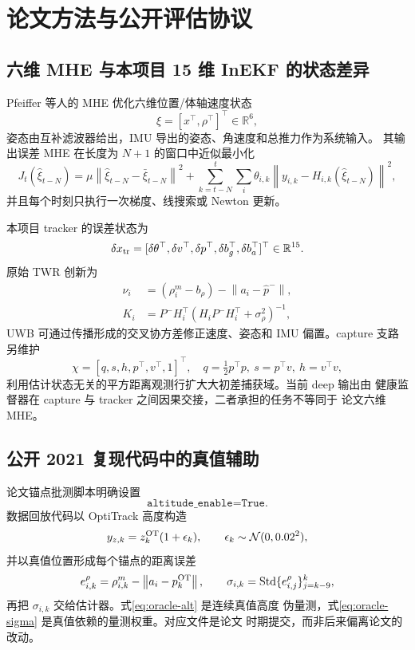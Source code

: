 \documentclass[11pt,a4paper]{ctexart}
\newcommand{\norm}[1]{\left\lVert #1\right\rVert}
\newcommand{\R}{\mathbb{R}}
\begin{document}
\section{论文方法与公开评估协议}

\subsection{六维 MHE 与本项目 15 维 InEKF 的状态差异}

Pfeiffer 等人的 MHE 优化六维位置/体轴速度状态
\begin{equation}
 \xi=[x^\top,\rho^\top]^\top\in\R^6,
\end{equation}
姿态由互补滤波器给出，IMU 导出的姿态、角速度和总推力作为系统输入。
其输出误差 MHE 在长度为 $N+1$ 的窗口中近似最小化
\begin{equation}
 J_t(\hat\xi_{t-N})=
 \mu\norm{\hat\xi_{t-N}-\bar\xi_{t-N}}^2+
 \sum_{k=t-N}^{t}\sum_i
 \theta_{i,k}\norm{y_{i,k}-H_{i,k}(\hat\xi_{t-N})}^2,
\end{equation}
并且每个时刻只执行一次梯度、线搜索或 Newton 更新。

本项目 tracker 的误差状态为
\begin{equation}
 \delta x_{\rm tr}=
 [\delta\theta^\top,\delta v^\top,\delta p^\top,
  \delta b_g^\top,\delta b_a^\top]^\top\in\R^{15}.
\end{equation}
原始 TWR 创新为
\begin{align}
 \nu_i&=(\rho_i^m-b_\rho)-\norm{a_i-\hat p^-},\\
 K_i&=P^-H_i^\top(H_iP^-H_i^\top+\sigma_\rho^2)^{-1},
\end{align}
UWB 可通过传播形成的交叉协方差修正速度、姿态和 IMU 偏置。capture
支路另维护
\begin{equation}
 \chi=[q,s,h,p^\top,v^\top,1]^\top,
 \quad q=\tfrac12p^\top p,\ s=p^\top v,\ h=v^\top v,
\end{equation}
利用估计状态无关的平方距离观测行扩大大初差捕获域。当前 deep 输出由
健康监督器在 capture 与 tracker 之间因果交接，二者承担的任务不等同于
论文六维 MHE。

\subsection{公开 2021 复现代码中的真值辅助}

论文锚点批测脚本明确设置
\begin{equation}
 \texttt{altitude\_enable=True}.
\end{equation}
数据回放代码以 OptiTrack 高度构造
\begin{equation}
 y_{z,k}=z_k^{\rm OT}(1+\epsilon_k),
 \qquad \epsilon_k\sim\mathcal N(0,0.02^2),
 \label{eq:oracle-alt}
\end{equation}
并以真值位置形成每个锚点的距离误差
\begin{equation}
 e_{i,k}^{\rho}=\rho_{i,k}^m-\norm{a_i-p_k^{\rm OT}},
 \qquad
 \sigma_{i,k}=\operatorname{Std}
 \{e_{i,j}^{\rho}\}_{j=k-9}^{k},
 \label{eq:oracle-sigma}
\end{equation}
再把 $\sigma_{i,k}$ 交给估计器。式\eqref{eq:oracle-alt} 是连续真值高度
伪量测，式\eqref{eq:oracle-sigma} 是真值依赖的量测权重。对应文件是论文
时期提交，而非后来偏离论文的改动\cite{codeanchors,codedrone}。
\end{document}
